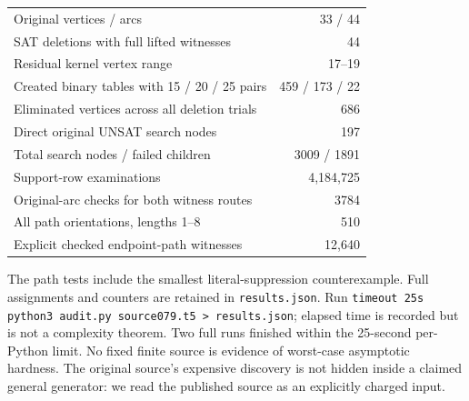\documentclass[11pt]{article}
\begin{document}
\begin{center}\begin{tabular}{lr}
Original vertices / arcs & 33 / 44\\
SAT deletions with full lifted witnesses & 44\\
Residual kernel vertex range & 17--19\\
Created binary tables with 15 / 20 / 25 pairs & 459 / 173 / 22\\
Eliminated vertices across all deletion trials & 686\\
Direct original UNSAT search nodes & 197\\
Total search nodes / failed children & 3009 / 1891\\
Support-row examinations & 4,184,725\\
Original-arc checks for both witness routes & 3784\\
All path orientations, lengths 1--8 & 510\\
Explicit checked endpoint-path witnesses & 12,640
\end{tabular}\end{center}
The path tests include the smallest literal-suppression counterexample.
Full assignments and counters are retained in \texttt{results.json}. Run
\texttt{timeout 25s python3 audit.py source079.t5 > results.json}; elapsed
time is recorded but is not a complexity theorem. Two full runs finished
within the 25-second per-Python limit. No fixed finite source is evidence
of worst-case asymptotic hardness. The original source's expensive discovery
is not hidden inside a claimed general generator: we read the published
source as an explicitly charged input.
\end{document}
